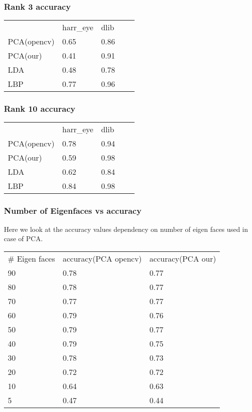 \newpage
\subsubsection{Rank 3 accuracy}

\begin{table}[!ht]
\begin{tabular}{lllll}
    & harr\_eye & dlib &  &  \\
PCA(opencv) & 0.65      & 0.86 &  &  \\
PCA(our) & 0.41    & 0.91 &  &  \\
LDA & 0.48      & 0.78 &  &  \\
LBP & 0.77      & 0.96 &  & 
\end{tabular}
\end{table}

\subsubsection{Rank 10 accuracy}

\begin{table}[!ht]
\begin{tabular}{lllll}
    & harr\_eye & dlib &  &  \\
PCA(opencv) & 0.78      & 0.94 &  &  \\
PCA(our) & 0.59    & 0.98 &  &  \\
LDA & 0.62      & 0.84 &  &  \\
LBP & 0.84      & 0.98 &  & 
\end{tabular}
\end{table}

\subsubsection{Number of Eigenfaces vs accuracy}
Here we look at the accuracy values dependency on number of eigen faces used in case of PCA.

\begin{table}[!ht]
\begin{tabular}{lll}
\# Eigen faces & accuracy(PCA opencv) & accuracy(PCA our) \\
90             & 0.78     & 0.77\\
80             & 0.78     & 0.77\\
70             & 0.77     & 0.77\\
60             & 0.79     & 0.76\\
50             & 0.79     & 0.77\\
40             & 0.79     & 0.75\\
30             & 0.78     & 0.73\\
20             & 0.72     & 0.72\\
10             & 0.64     & 0.63\\
5              & 0.47     & 0.44
\end{tabular}
\end{table}

